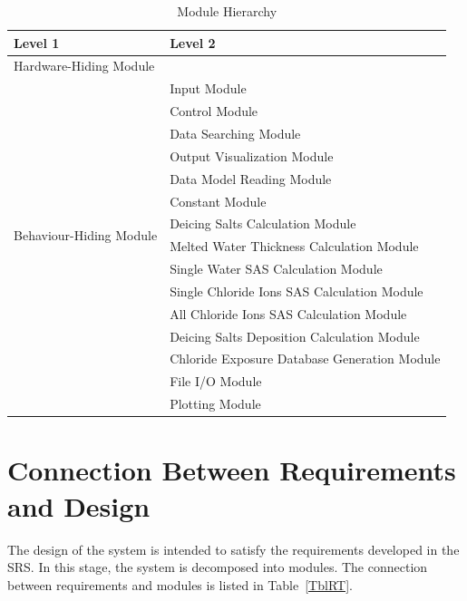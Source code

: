 \documentclass[12pt, titlepage]{article}
\begin{document}
\begin{table}[h!]
\centering
\begin{tabular}{p{} p{}}
\toprule
\textbf{Level 1} & \textbf{Level 2}\\
\midrule

{Hardware-Hiding Module} & ~ \\
\midrule

\multirow{14}{0.3\textwidth}{Behaviour-Hiding Module} & Input Module\\
& Control Module\\
& Data Searching Module\\
& Output Visualization Module\\
& Data Model Reading Module \\
& Constant Module \\
& Deicing Salts Calculation Module \\
& Melted Water Thickness Calculation Module \\
& Single Water SAS Calculation Module \\
& Single Chloride Ions SAS Calculation Module \\
& All Chloride Ions SAS Calculation Module \\
& Deicing Salts Deposition Calculation Module \\
& Chloride Exposure Database Generation Module\\
\midrule

\multirow{2}{0.3\textwidth}{Software Decision Module} &  File I/O Module \\
& Plotting Module \\
\bottomrule

\end{tabular}
\caption{Module Hierarchy}
\label{TblMH}
\end{table}

\section{Connection Between Requirements and Design} \label{SecConnection}

The design of the system is intended to satisfy the requirements developed in
the SRS. In this stage, the system is decomposed into modules. The connection
between requirements and modules is listed in Table~\ref{TblRT}. 

\end{document}
